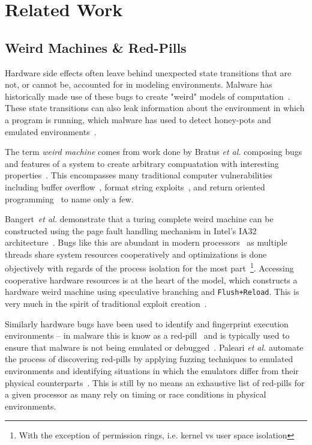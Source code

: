 
\section{Related Work}
\label{sec:related-work}


\subsection{Weird Machines \& Red-Pills}
Hardware side effects often leave behind unexpected state transitions 
that are not, or cannot be, accounted for in modeling environments. Malware
has historically made use of these bugs to create "weird" models of 
computation~\cite{weird_machines}. These state transitions can also leak 
information about the environment in which a program is running, which 
malware has used to detect honey-pots and emulated 
environments~\cite{balzarotti2010efficient}.

The term \textit{weird machine} comes from work done by Bratus \textit{et al.}
composing bugs and features of a system to create arbitrary compuatation with 
interesting properties~\cite{weird_machines,bratus2011exploit}. This 
encompasses many traditional computer vulnerabilities including 
buffer overflow~\cite{buffer_overflow}, format string exploits~\cite{format_string_exploit}, 
and return oriented programming~\cite{shacham2007geometry} to name only a few. 

Bangert~\textit{et al.} demonstrate that a turing complete weird machine 
can be constructed using the page fault handling mechanism in Intel's
IA32 architecture~\cite{bangert2013page}. Bugs like this are abundant in
modern processors~\cite{d2015exploiting} as multiple threads share system resources cooperatively
and optimizations is done objectively with regards of the 
process isolation for the most part~\footnote{With the exception of permission 
rings, i.e. kernel vs user space isolation}. Accessing cooperative hardware resources is at
the heart of the \speculake model, which constructs a hardware weird machine
using speculative branching and \texttt{Flush+Reload}. This is 
very much in the spirit of traditional exploit creation~\cite{weird_exploits}.

\smallskip 

Similarly hardware bugs have been used to identify and fingerprint execution
environments -- in malware this is know as a red-pill~\cite{red-pill} and 
is typically used to ensure that malware is not being emulated or 
debugged~\cite{lindorfer2011detecting, balzarotti2010efficient}. Paleari 
\textit{et al.} automate the process of discovering red-pills by applying 
fuzzing techniques to emulated environments and identifying situations 
in which the emulators differ from their physical counterparts~\cite{paleari2009fistful}.
This is still by no means an exhaustive list of red-pills for a given 
processor as many rely on timing or race conditions in physical 
environments. 

